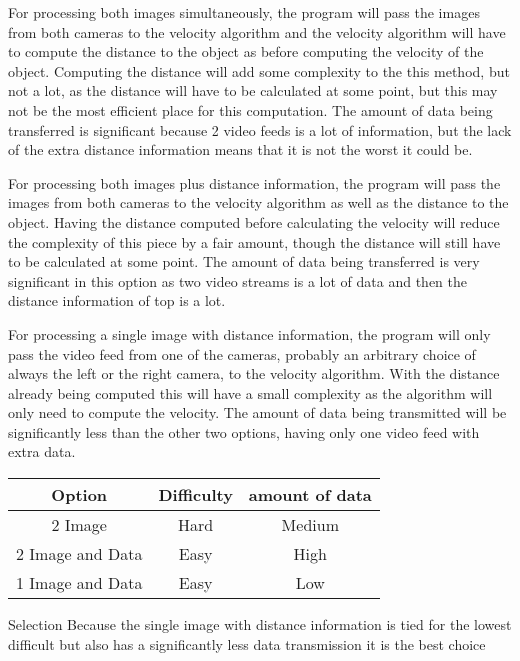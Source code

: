 \documentclass[letterpaper,10pt,onecolumn,draftclsnofoot]{IEEEtran}
\begin{document}
For processing both images simultaneously, the program will pass the images from both cameras to the velocity algorithm and the velocity algorithm will have to compute the distance to the object as before computing the velocity of the object.
Computing the distance will add some complexity to the this method, but not a lot, as the distance will have to be calculated at some point, but this may not be the most efficient place for this computation.
The amount of data being transferred is significant because 2 video feeds is a lot of information, but the lack of the extra distance information means that it is not the worst it could be.

For processing both images plus distance information, the program will pass the images from both cameras to the velocity algorithm as well as the distance to the object.
Having the distance computed before calculating the velocity will reduce the complexity of this piece by a fair amount, though the distance will still have to be calculated at some point.
The amount of data being transferred is very significant in this option as two video streams is a lot of data and then the distance information of top is a lot.

For processing a single image with distance information, the program will only pass the video feed from one of the cameras, probably an arbitrary choice of always the left or the right camera, to the velocity algorithm.
With the distance already being computed this will have a small complexity as the algorithm will only need to compute the velocity.
The amount of data being transmitted will be significantly less than the other two options, having only one video feed with extra data.


\begin{center}
	\begin{tabular}{|c|c|c|}
		\hline
		\textbf{Option} & \textbf{Difficulty} & \textbf{amount of data} \\
		\hline
		2 Image & Hard & Medium \\
		\hline
		2 Image and Data & Easy & High\\
		\hline
		1 Image and Data & Easy & Low \\
		\hline
		
	\end{tabular}
\end{center}

Selection
Because the single image with distance information is tied for the lowest difficult but also has a significantly less data transmission it is the best choice
\end{document}
